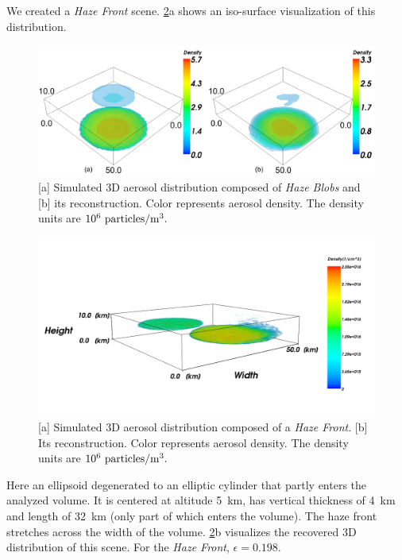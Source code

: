 \documentclass[10pt,letterpaper]{article}
\newcommand{\yoavcomment}[1]{}
\renewcommand{\yoavcomment}[1]{#1} %
\begin{document}
We created a {\em Haze Front} scene. \cref{fig:front_sim}a shows an
iso-surface visualization of this distribution.
\begin{figure}
  \centering
  \yoavcomment{\includegraphics[width=\columnwidth]{images/two_clouds}}
  \caption{\small [a] Simulated 3D aerosol distribution composed of
    {\em Haze Blobs} and [b] its reconstruction. Color represents
    aerosol density. The density units are $10^{6}~{\rm
      particles}/{\rm m}^3.$}
  \label{fig:two_clouds_sim}
\end{figure}
\begin{figure}
  \centering
  \yoavcomment{\includegraphics[width=\columnwidth]{images/front}}
  \caption{\small [a] Simulated 3D aerosol distribution composed of a
    {\em Haze Front}. [b] Its reconstruction. Color represents aerosol
    density. The density units are $10^{6}~{\rm particles}/{\rm
      m}^3.$}
  \label{fig:front_sim}
\end{figure}
Here an ellipsoid degenerated to an elliptic cylinder that partly
enters the analyzed volume. It is centered at altitude \SI{5}{\km},
has vertical thickness of \SI{4}{\km} and length of \SI{32}{\km} (only
part of which enters the volume). The haze front stretches across the
width of the volume.  \cref{fig:front_sim}b visualizes the recovered
3D distribution of this scene. For the {\em Haze Front},
$\epsilon=0.198$.
\end{document}
